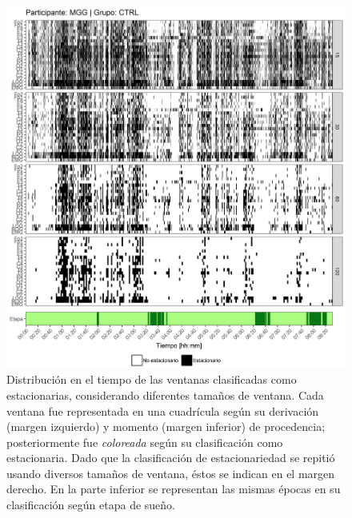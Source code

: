 \documentclass[12pt,letterpaper,draft]{book}
\begin{document}
\begin{figure}
\centering
\includegraphics[width=\linewidth]
{./scripts_graf_res/MGG_patrones_2.png}
\caption[Distribución en el tiempo de las ventanas clasificadas como estacionarias, considerando diferentes tamaños de ventana]{Distribución en el tiempo de las ventanas clasificadas como estacionarias, considerando diferentes tamaños de ventana. 
Cada ventana fue representada en una cuadrícula según su derivación (margen izquierdo) y momento (margen inferior) de procedencia; posteriormente fue \textit{coloreada} según su clasificación como estacionaria.
Dado que la clasificación de estacionariedad se repitió usando diversos tamaños de ventana, éstos se indican en el margen derecho.
En la parte inferior se representan las mismas épocas en su clasificación según etapa de sueño.}
\end{figure}
\end{document}
